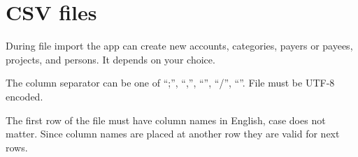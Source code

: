\documentclass[a4paper,10pt,english]{sphinxmanual}
\begin{document}
\noindent{}

\noindent{}

\noindent{}

\noindent{}

\noindent{}


\section{CSV files}
\label{\detokenize{import:csv-files}}
During  file import the app can create new accounts, categories, payers or payees,
projects, and persons. It depends on your choice.

The column separator can be one of  “;”, “,”, “\textbar{}”, “/”, “”. File must be UTF-8 encoded.

The first row of the file must have column names in English, case does not matter.
Since column names are placed at another row they are valid for next rows.
\end{document}
